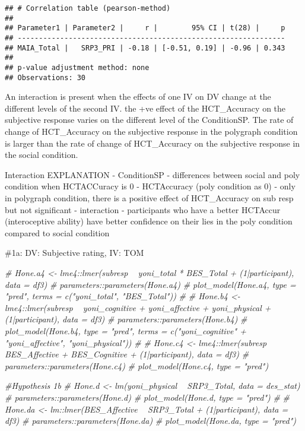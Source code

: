 \documentclass[
]{article}
\newenvironment{Shaded}{\begin{snugshade}}{\end{snugshade}}
\newcommand{\CommentTok}[1]{\textcolor[rgb]{0.56,0.35,0.01}{\textit{#1}}}
\begin{document}
\begin{verbatim}
## # Correlation table (pearson-method)
## 
## Parameter1 | Parameter2 |     r |        95% CI | t(28) |     p
## ---------------------------------------------------------------
## MAIA_Total |   SRP3_PRI | -0.18 | [-0.51, 0.19] | -0.96 | 0.343
## 
## p-value adjustment method: none
## Observations: 30
\end{verbatim}

An interaction is present when the effects of one IV on DV change at the
different levels of the second IV. the +ve effect of the HCT\_Accuracy
on the subjective response varies on the different level of the
ConditionSP. The rate of change of HCT\_Accuracy on the subjective
response in the polygraph condition is larger than the rate of change of
HCT\_Accuracy on the subjective response in the social condition.

Interaction EXPLANATION - ConditionSP - differences between social and
poly condition when HCTACCuracy is 0 - HCTAccuracy (poly condition as 0)
- only in polygraph condition, there is a positive effect of
HCT\_Accuracy on sub resp but not significant - interaction -
participants who have a better HCTAccur (interoceptive ability) have
better confidence on their lies in the poly condition compared to social
condition

\#1a: DV: Subjective rating, IV: TOM

\begin{Shaded}
\begin{Highlighting}[]
\CommentTok{# Hone.a4 <- lme4::lmer(subresp ~  yoni_total * BES_Total + (1|participant), data = df3)}
\CommentTok{# parameters::parameters(Hone.a4)}
\CommentTok{# plot_model(Hone.a4, type = "pred", terms = c("yoni_total", "BES_Total"))}
\CommentTok{# }
\CommentTok{# Hone.b4 <- lme4::lmer(subresp ~ yoni_cognitive + yoni_affective + yoni_physical + (1|participant), data = df3)}
\CommentTok{# parameters::parameters(Hone.b4)}
\CommentTok{# plot_model(Hone.b4, type = "pred", terms = c("yoni_cognitive"  + "yoni_affective", "yoni_physical"))}
\CommentTok{# }
\CommentTok{# Hone.c4 <- lme4::lmer(subresp ~  BES_Affective + BES_Cognitive + (1|participant), data = df3)}
\CommentTok{# parameters::parameters(Hone.c4)}
\CommentTok{# plot_model(Hone.c4, type = "pred")}
\end{Highlighting}
\end{Shaded}

\begin{Shaded}
\begin{Highlighting}[]
\CommentTok{#Hypothesis 1b  }
\CommentTok{# Hone.d <- lm(yoni_physical ~  SRP3_Total, data = des_stat)}
\CommentTok{# parameters::parameters(Hone.d)}
\CommentTok{# plot_model(Hone.d, type = "pred")}
\CommentTok{# }
\CommentTok{# Hone.da <- lm::lmer(BES_Affective ~  SRP3_Total + (1|participant), data = df3)}
\CommentTok{# parameters::parameters(Hone.da)}
\CommentTok{# plot_model(Hone.da, type = "pred")}
\end{Highlighting}
\end{Shaded}
\end{document}
